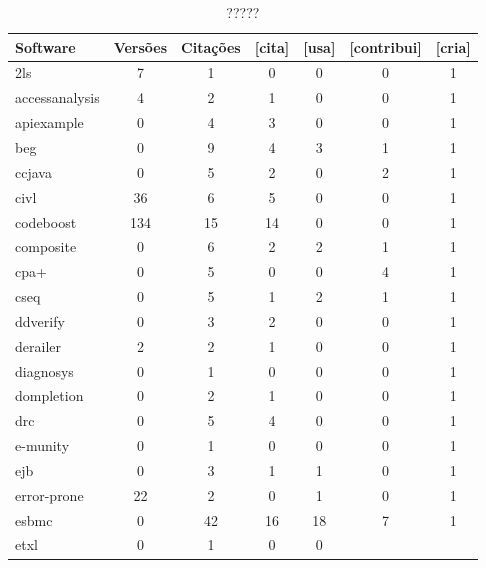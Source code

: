 
%


\begin{table}[H]
\caption{?????}
\centering
\begin{tabular}{| l | c | c | c | c | c | c |}
  \hline
  Software & Versões & Citações & [cita] & [usa] & [contribui] & [cria] \\
  \hline
  2ls
  &
  7
  &
  1
  &
  0
  &
  0
  &
  0
  &
  1
  \\
  accessanalysis
  &
  4
  &
  2
  &
  1
  &
  0
  &
  0
  &
  1
  \\
  apiexample
  &
  0
  &
  4
  &
  3
  &
  0
  &
  0
  &
  1
  \\
  beg
  &
  0
  &
  9
  &
  4
  &
  3
  &
  1
  &
  1
  \\
  ccjava
  &
  0
  &
  5
  &
  2
  &
  0
  &
  2
  &
  1
  \\
  civl
  &
  36
  &
  6
  &
  5
  &
  0
  &
  0
  &
  1
  \\
  codeboost
  &
  134
  &
  15
  &
  14
  &
  0
  &
  0
  &
  1
  \\
  composite
  &
  0
  &
  6
  &
  2
  &
  2
  &
  1
  &
  1
  \\
  cpa+
  &
  0
  &
  5
  &
  0
  &
  0
  &
  4
  &
  1
  \\
  cseq
  &
  0
  &
  5
  &
  1
  &
  2
  &
  1
  &
  1
  \\
  ddverify
  &
  0
  &
  3
  &
  2
  &
  0
  &
  0
  &
  1
  \\
  derailer
  &
  2
  &
  2
  &
  1
  &
  0
  &
  0
  &
  1
  \\
  diagnosys
  &
  0
  &
  1
  &
  0
  &
  0
  &
  0
  &
  1
  \\
  dompletion
  &
  0
  &
  2
  &
  1
  &
  0
  &
  0
  &
  1
  \\
  drc
  &
  0
  &
  5
  &
  4
  &
  0
  &
  0
  &
  1
  \\
  e-munity
  &
  0
  &
  1
  &
  0
  &
  0
  &
  0
  &
  1
  \\
  ejb
  &
  0
  &
  3
  &
  1
  &
  1
  &
  0
  &
  1
  \\
  error-prone
  &
  22
  &
  2
  &
  0
  &
  1
  &
  0
  &
  1
  \\
  esbmc
  &
  0
  &
  42
  &
  16
  &
  18
  &
  7
  &
  1
  \\
  etxl
  &
  0
  &
  1
  &
  0
  &
  0

\end{tabular}
\end{table}
